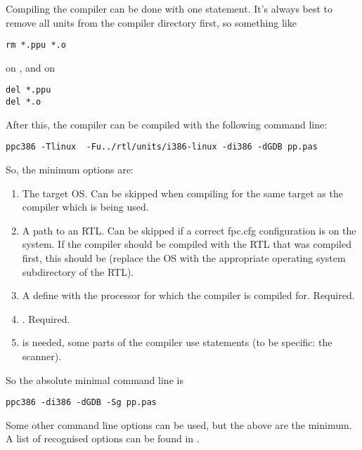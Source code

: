 Compiling the compiler can be done with one statement. It's always best to
remove all units from the compiler directory first, so something like
\begin{verbatim}
rm *.ppu *.o
\end{verbatim}
on \linux, and on \dos
\begin{verbatim}
del *.ppu
del *.o
\end{verbatim}
After this, the compiler can be compiled with the following command line:
\begin{verbatim}
ppc386 -Tlinux  -Fu../rtl/units/i386-linux -di386 -dGDB pp.pas
\end{verbatim}
So, the minimum options are:
\begin{enumerate}
\item The target OS. Can be skipped when compiling for the same target as
the compiler which is being used.
\item A path to an RTL. Can be skipped if a correct fpc.cfg configuration
is on the system. If the compiler should be compiled with the RTL that was
compiled first, this should be  (replace the OS with the 
appropriate operating system subdirectory of the RTL).
\item A define with the processor for which the compiler is compiled for. Required.
\item {}. Required.
\item {} is needed, some parts of the compiler use 
statements (to be specific: the scanner).
\end{enumerate}
So the absolute minimal command line is
\begin{verbatim}
ppc386 -di386 -dGDB -Sg pp.pas
\end{verbatim}

Some other command line options can be used, but the above are the
minimum. A list of recognised options can be found in .

